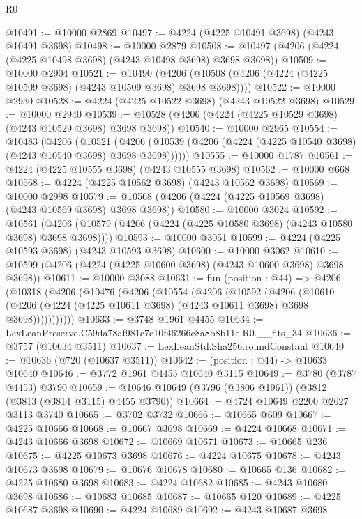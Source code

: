 \begin{lexlean}{R0}
\begin{coremodule}
@10491 := @10000 @2869
@10497 := @4224 (@4225 @10491 @3698) (@4243 @10491 @3698)
@10498 := @10000 @2879
@10508 := @10497 (@4206 (@4224 (@4225 @10498 @3698) (@4243 @10498 @3698) @3698 @3698))
@10509 := @10000 @2904
@10521 := @10490
    (@4206 (@10508 (@4206 (@4224 (@4225 @10509 @3698) (@4243 @10509 @3698) @3698 @3698))))
@10522 := @10000 @2930
@10528 := @4224 (@4225 @10522 @3698) (@4243 @10522 @3698)
@10529 := @10000 @2940
@10539 := @10528 (@4206 (@4224 (@4225 @10529 @3698) (@4243 @10529 @3698) @3698 @3698))
@10540 := @10000 @2965
@10554 := @10483
    (@4206
      (@10521
        (@4206 (@10539 (@4206 (@4224 (@4225 @10540 @3698) (@4243 @10540 @3698) @3698 @3698))))))
@10555 := @10000 @1787
@10561 := @4224 (@4225 @10555 @3698) (@4243 @10555 @3698)
@10562 := @10000 @668
@10568 := @4224 (@4225 @10562 @3698) (@4243 @10562 @3698)
@10569 := @10000 @2998
@10579 := @10568 (@4206 (@4224 (@4225 @10569 @3698) (@4243 @10569 @3698) @3698 @3698))
@10580 := @10000 @3024
@10592 := @10561
    (@4206 (@10579 (@4206 (@4224 (@4225 @10580 @3698) (@4243 @10580 @3698) @3698 @3698))))
@10593 := @10000 @3051
@10599 := @4224 (@4225 @10593 @3698) (@4243 @10593 @3698)
@10600 := @10000 @3062
@10610 := @10599 (@4206 (@4224 (@4225 @10600 @3698) (@4243 @10600 @3698) @3698 @3698))
@10611 := @10000 @3088
@10631 := fun (position : @44) =>
  @4206
    (@10318
      (@4206
        (@10476
          (@4206
            (@10554
              (@4206
                (@10592
                  (@4206
                    (@10610
                      (@4206 (@4224 (@4225 @10611 @3698) (@4243 @10611 @3698) @3698 @3698)))))))))))
@10633 := @3748 @1961 @4455
@10634 := LexLeanPreserve.C59da78af981c7e10f46266c8a8b8b11e.R0.__fits_34
@10636 := @3757 (@10634 @3511)
@10637 := LexLeanStd.Sha256.roundConstant
@10640 := @10636 (@720 (@10637 @3511))
@10642 := (position : @44) -> @10633 @10640
@10646 := @3772 @1961 @4455 @10640 @3115
@10649 := @3780 (@3787 @4453) @3790
@10659 := @10646 @10649 (@3796 (@3806 @1961)) (@3812 (@3813 (@3814 @3115) @4455 @3790))
@10664 := @4724 @10649 @2200 @2627 @3113 @3740
@10665 := @3702 @3732
@10666 := @10665 @609
@10667 := @4225 @10666
@10668 := @10667 @3698
@10669 := @4224 @10668
@10671 := @4243 @10666 @3698
@10672 := @10669 @10671
@10673 := @10665 @236
@10675 := @4225 @10673 @3698
@10676 := @4224 @10675
@10678 := @4243 @10673 @3698
@10679 := @10676 @10678
@10680 := @10665 @136
@10682 := @4225 @10680 @3698
@10683 := @4224 @10682
@10685 := @4243 @10680 @3698
@10686 := @10683 @10685
@10687 := @10665 @120
@10689 := @4225 @10687 @3698
@10690 := @4224 @10689
@10692 := @4243 @10687 @3698

\end{coremodule}
\end{lexlean}
